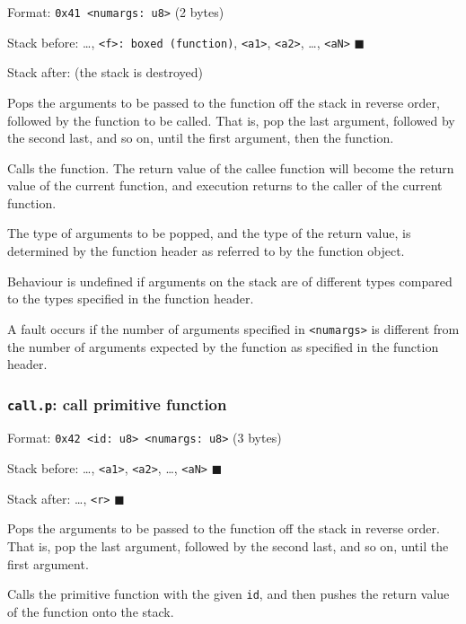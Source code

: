 Format: \texttt{0x41\ \textless{}numargs:\ u8\textgreater{}} (2 bytes)

Stack before: \ldots,
\texttt{\textless{}f\textgreater{}:\ boxed\ (function)},
\texttt{\textless{}a1\textgreater{}},
\texttt{\textless{}a2\textgreater{}}, \ldots,
\texttt{\textless{}aN\textgreater{}} \(\blacksquare\)

Stack after: (the stack is destroyed)

Pops the arguments to be passed to the function off the stack in reverse
order, followed by the function to be called. That is, pop the last
argument, followed by the second last, and so on, until the first
argument, then the function.

Calls the function. The return value of the callee function will become
the return value of the current function, and execution returns to the
caller of the current function.

The type of arguments to be popped, and the type of the return value, is
determined by the function header as referred to by the function object.

Behaviour is undefined if arguments on the stack are of different types
compared to the types specified in the function header.

A fault occurs if the number of arguments specified in
\texttt{\textless{}numargs\textgreater{}} is different from the number
of arguments expected by the function as specified in the function
header.

\subsubsection{\texorpdfstring{\texttt{call.p}: call primitive
function}{call.p: call primitive function}}

Format:
\texttt{0x42\ \textless{}id:\ u8\textgreater{}\ \textless{}numargs:\ u8\textgreater{}}
(3 bytes)

Stack before: \ldots, \texttt{\textless{}a1\textgreater{}},
\texttt{\textless{}a2\textgreater{}}, \ldots,
\texttt{\textless{}aN\textgreater{}} \(\blacksquare\)

Stack after: \ldots, \texttt{\textless{}r\textgreater{}}
\(\blacksquare\)

Pops the arguments to be passed to the function off the stack in reverse
order. That is, pop the last argument, followed by the second last, and
so on, until the first argument.

Calls the primitive function with the given \texttt{id}, and then pushes
the return value of the function onto the stack.

